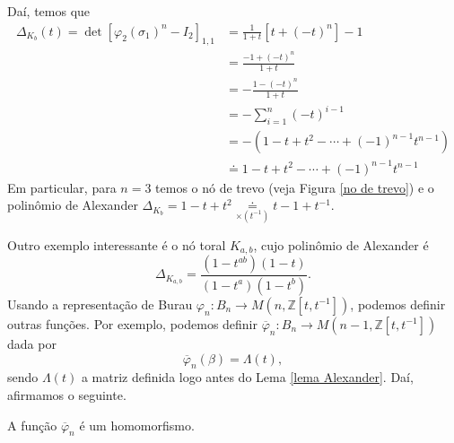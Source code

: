 	Daí, temos que
	\begin{align*}
    	\Delta_{K_b}(t) = \det[\varphi_2(\sigma_1)^n - I_2]_{1,1} &= \frac{1}{1+t}[t+(-t)^n] - 1 \\
    	&= \frac{-1 + (-t)^n}{1+t} \\
    	&= -\frac{1 - (-t)^n}{1+t} \\
    	&= -\sum_{i=1}^{n}(-t)^{i-1} \\
    	&= -(1-t+t^2-\cdots+(-1)^{n-1}t^{n-1}) \\
    	&\doteq 1-t+t^2-\cdots+(-1)^{n-1}t^{n-1}
	\end{align*}
	Em particular, para $n = 3$ temos o nó de trevo (veja Figura \ref{no de trevo}) e o 
	polinômio de Alexander $\Delta_{K_b} = 1-t+t^2\underset{\times(t^{-1})}{\doteq} t-1+t^{-1}$.
	
	\par\vspace{0.3cm} Outro exemplo interessante é o nó toral $K_{a,b}$, cujo polinômio de Alexander é
	\begin{equation*}
	    \Delta_{K_{a,b}} = \frac{(1-t^{ab})(1-t)}{(1-t^a)(1-t^b)}.
	\end{equation*}
	Usando a representação de Burau $\varphi_n: B_n\to M(n, \mathbb{Z}[t,t^{-1}])$, 
	podemos definir outras funções. Por exemplo, podemos definir 
	$\overline{\varphi}_n: B_n\to M(n-1, \mathbb{Z}[t,t^{-1}])$ dada por
	\begin{equation*}
	    \overline{\varphi}_n(\beta) = \Lambda(t),
	\end{equation*} 
	sendo $\Lambda(t)$ a matriz definida logo antes do Lema \ref{lema Alexander}. Daí, afirmamos o seguinte.
	\begin{prop}
	\label{parecido com Burau}
		A função $\overline{\varphi}_n$ é um homomorfismo. %
	\end{prop}
